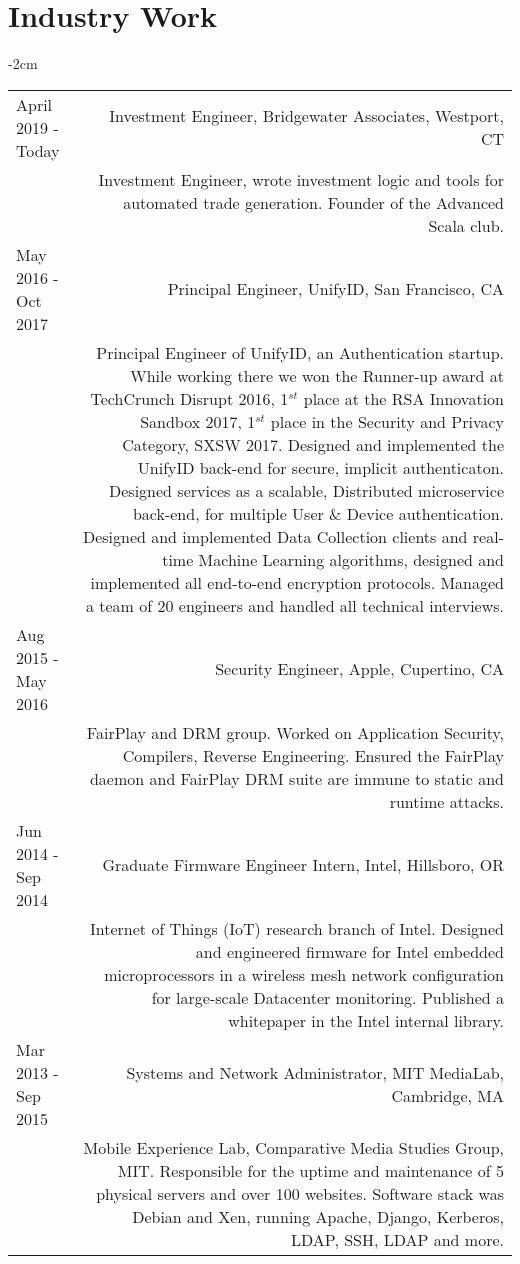 \documentclass[lettersize,10pt]{article}
\begin{document}
\section{Industry Work}
\begin{adjustwidth}{}{-2cm}
  \begin{tabularx}{\textwidth}{L R}
	April 2019 - Today & {\sc Investment Engineer, Bridgewater Associates}, Westport, CT \\
	& Investment Engineer, wrote investment logic and tools for automated trade generation. Founder of the Advanced Scala club. \\

    May 2016 - Oct 2017 & {\sc Principal Engineer, UnifyID}, San Francisco, CA\\
	& Principal Engineer of UnifyID, an Authentication startup.  While working there we won the Runner-up award at TechCrunch Disrupt 2016,
	  1$^{st}$ place at the RSA Innovation Sandbox 2017, 1$^{st}$ place in the Security and Privacy Category, SXSW 2017. Designed and
      implemented the UnifyID back-end for secure, implicit authenticaton. Designed services as a scalable,
      Distributed microservice back-end, for multiple User \& Device authentication. Designed and implemented Data Collection clients and
      real-time Machine Learning algorithms, designed and implemented all end-to-end encryption protocols. Managed a team of 20 engineers and
      handled all technical interviews. \\

	Aug 2015 - May 2016 & {\sc Security Engineer, Apple}, Cupertino, CA \\
	& FairPlay and DRM group. Worked on Application Security, Compilers, Reverse Engineering.
	Ensured the FairPlay daemon and FairPlay DRM suite are immune to static and runtime attacks. \\

	Jun 2014 - Sep 2014 & {\sc Graduate Firmware Engineer Intern, Intel}, Hillsboro, OR \\
	& Internet of Things (IoT) research branch of Intel. Designed and engineered firmware for Intel embedded microprocessors
	  in a wireless mesh network configuration for large-scale Datacenter monitoring. Published a whitepaper in the Intel internal library. \\

    Mar 2013 - Sep 2015 & {\sc Systems and Network Administrator}, MIT MediaLab, Cambridge, MA \\
	& Mobile Experience Lab, Comparative Media Studies Group, MIT. Responsible for the uptime and maintenance of 5 physical servers and over 100 websites.
	  Software stack was Debian and Xen, running Apache, Django, Kerberos, LDAP, SSH, LDAP and more. \\


\end{tabularx}
\end{adjustwidth}
\end{document}
